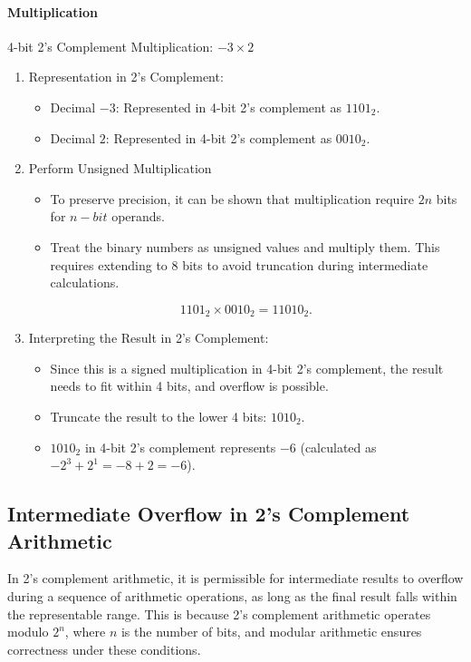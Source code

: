 \paragraph{Multiplication} 4-bit 2's Complement Multiplication: $-3 \times 2$
\begin{enumerate}
    \item Representation in 2's Complement:
   \begin{itemize}
       \item Decimal \( -3 \): Represented in 4-bit 2's complement as \( 1101_2 \).
       \item Decimal \( 2 \): Represented in 4-bit 2's complement as \( 0010_2 \).
   \end{itemize}

    \item Perform Unsigned Multiplication
    \begin{itemize}
        \item To preserve precision, it can be shown that multiplication require $2n$ bits for $n-bit$ operands.
        \item Treat the binary numbers as unsigned values and multiply them. This requires extending to 8 bits to avoid truncation during intermediate calculations. 
    \end{itemize}   
   \[
   1101_2 \times 0010_2 = 11010_2.
   \]

    \item Interpreting the Result in 2's Complement:
   
   \begin{itemize}
        \item Since this is a signed multiplication in 4-bit 2's complement, the result needs to fit within 4 bits, and overflow is possible.
       \item Truncate the result to the lower 4 bits: \( 1010_2 \).
       \item \( 1010_2 \) in 4-bit 2's complement represents \( -6 \) (calculated as \( -2^{3} + 2^{1} = -8 + 2 = -6 \)).
   \end{itemize}
   
\end{enumerate}


\subsection{Intermediate Overflow in 2's Complement Arithmetic}
In 2's complement arithmetic, it is permissible for intermediate results to overflow during a sequence of arithmetic operations, as long as the final result falls within the representable range. This is because 2's complement arithmetic operates modulo \( 2^n \), where \( n \) is the number of bits, and modular arithmetic ensures correctness under these conditions.

